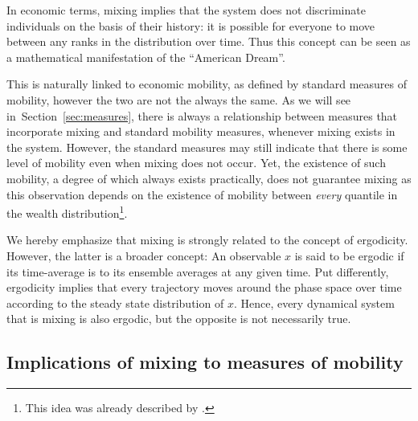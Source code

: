 \documentclass[11pt]{article}
\newcommand{\Sref}[1]{Section~\ref{sec:#1}}
\numberwithin{equation}{section}
\begin{document}
In economic terms, mixing implies that the system does not discriminate individuals on the basis of their history: it is possible for everyone to move between any ranks in the distribution over time. Thus this concept can be seen as a mathematical manifestation of the ``American Dream''. 

This is naturally linked to economic mobility, as defined by standard measures of mobility, however the two are not the always the same. As we will see in~\Sref{measures}, there is always a relationship between measures that incorporate mixing and standard mobility measures, whenever mixing exists in the system. However, the standard measures may still indicate that there is some level of mobility even when mixing does not occur. Yet, the existence of such mobility, a degree of which always exists practically, does not guarantee mixing as this observation depends on the existence of mobility between \textit{every} quantile in the wealth distribution\footnote{This idea was already described by \citet{Mcfarland1970}.}.
 
We hereby emphasize that mixing is strongly related to the concept of ergodicity. However, the latter is a broader concept: An observable $x$ is said to be ergodic if its time-average is to its ensemble averages at any given time. Put differently, ergodicity implies that every trajectory moves around the phase space over time according to the steady state distribution of $x$. Hence, every dynamical system that is mixing is also ergodic, but the opposite is not necessarily true.

\subsection{Implications of mixing to measures of mobility}
\end{document}
